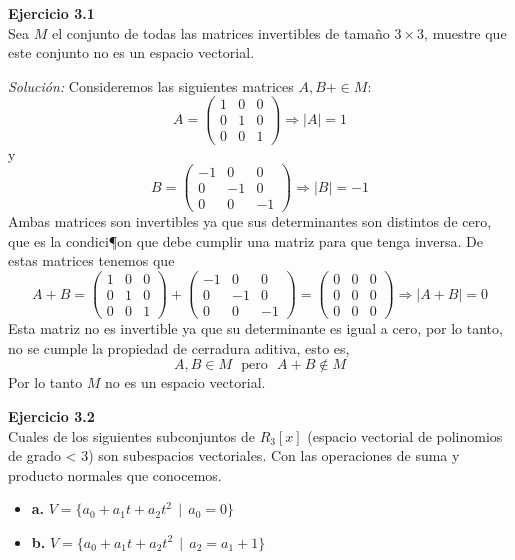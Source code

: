 \documentclass{article}
\newenvironment{problem}[2][Ejercicio]
    { \begin{mdframed}[backgroundcolor=gray!20] \textbf{#1 #2} \\}
    {  \end{mdframed}}
\newenvironment{solution}
    {\textit{Solución:}}
    {}
\begin{document}
\begin{problem}{3.1}
    Sea $M$ el conjunto de todas las matrices invertibles de tamaño $3 \times 3$, muestre que este conjunto no es un espacio vectorial.
\end{problem}
\begin{solution}
    Consideremos las siguientes matrices $A,B +\in M$:
\[
A= \begin{pmatrix} 1 & 0 & 0 \\0 & 1 & 0 \\ 0 & 0 & 1 \end{pmatrix} \Rightarrow |A| = 1
\]
y
\[
B= \begin{pmatrix} -1 & 0 & 0 \\0 & -1 & 0 \\ 0 & 0 & -1 \end{pmatrix} \Rightarrow |B| = -1
\]
Ambas matrices son invertibles ya que sus determinantes son distintos de cero, que es la condici¶on que debe cumplir una matriz para que tenga inversa. De estas matrices tenemos que
\[
A+B = \begin{pmatrix} 1 & 0 & 0 \\0 & 1 & 0 \\ 0 & 0 & 1 \end{pmatrix} +
\begin{pmatrix} -1 & 0 & 0 \\0 & -1 & 0 \\ 0 & 0 & -1 \end{pmatrix} = 
\begin{pmatrix} 0 & 0 & 0 \\0 & 0 & 0 \\ 0 & 0 & 0 \end{pmatrix} \Rightarrow |A+B| = 0
\]
Esta matriz no es invertible ya que su determinante es igual a cero, por lo tanto, no se cumple la propiedad de cerradura aditiva, esto es,
\[
A,B\in M \ \ \ \text{pero} \ \ \ A+B\notin M
\]
Por lo tanto $M$ no es un espacio vectorial.
\end{solution}

\begin{problem}{3.2}
    Cuales de los siguientes subconjuntos de $R_3[x]$ (espacio vectorial de polinomios de grado < 3) son subespacios vectoriales. Con las operaciones de suma y producto normales que conocemos.
\begin{itemize}
\item 
\textbf{a.} $V = \{ a_0 + a_1t + a_2t^2 \ \ | \ \ a_0 = 0 \}$
\item 
\textbf{b.} $V = \{ a_0 + a_1t + a_2t^2 \ \ | \ \ a_2 = a_1 + 1 \}$
\end{itemize}
\end{problem}
\end{document}
